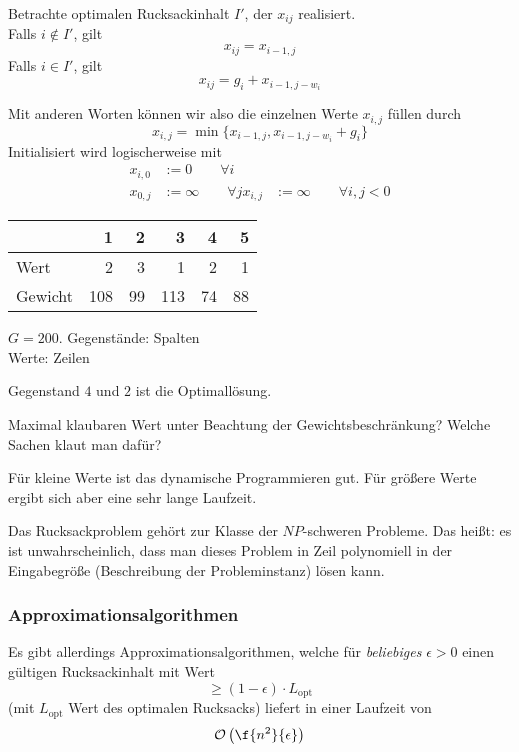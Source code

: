 \documentclass[11pt]{scrartcl}
\renewcommand{\O}{\mathcal{O}}
\begin{document}
Betrachte optimalen Rucksackinhalt $I'$, der $x_{ij}$ realisiert.\\
Falls $i\not\in I'$, gilt 
\[
	x_{ij}= x_{i-1,j}
\]
Falls $i\in I'$, gilt 
\[
	x_{ij} = g_i + x_{i-1,j-w_i}
\]

Mit anderen Worten können wir also die einzelnen Werte $x_{i,j}$ füllen durch
\[
	x_{i,j} = \min\{x_{i-1,j}, x_{i-1,j-w_i} + g_i\}
\]
Initialisiert wird logischerweise mit
\begin{align*}
	x_{i,0} &:= 0 \qquad \forall i\\
	x_{0,j} &:= \infty \qquad \forall j
	x_{i,j} &:= \infty \qquad \forall i,j < 0
\end{align*}

\begin{ex}
	\begin{tabular}{l|rrrrr}
		~ & 1 & 2 & 3 & 4 & 5 \\
		\hline
		Wert&2 & 3 & 1 & 2 & 1\\
		Gewicht&108 & 99 & 113 & 74 & 88
	\end{tabular}
	$G=200$.
	Gegenstände: Spalten\\
	Werte: Zeilen

	Gegenstand $4$ und $2$ ist die Optimallösung.

\end{ex}

Maximal klaubaren Wert unter Beachtung der Gewichtsbeschränkung?
Welche Sachen klaut man dafür? 

\begin{note}
	Für kleine Werte ist das dynamische Programmieren gut.
	Für größere Werte ergibt sich aber eine sehr lange Laufzeit.
\end{note}

Das Rucksackproblem gehört zur Klasse der $NP$-schweren Probleme.
Das heißt: es ist unwahrscheinlich, dass man dieses Problem in Zeil polynomiell in der Eingabegröße (Beschreibung der Probleminstanz) lösen kann.


\subsubsection{Approximationsalgorithmen}

Es gibt allerdings Approximationsalgorithmen, welche für \emph{beliebiges} $\epsilon > 0$ einen gültigen Rucksackinhalt mit Wert
\[
	\ge (1-\epsilon)\cdot L_{\text{opt}}
\]
(mit $L_{\text{opt}}$ Wert des optimalen Rucksacks)
liefert in einer Laufzeit von
\[
	\O\left( \f{n^2}{\epsilon}\right)
\]
\end{document}
